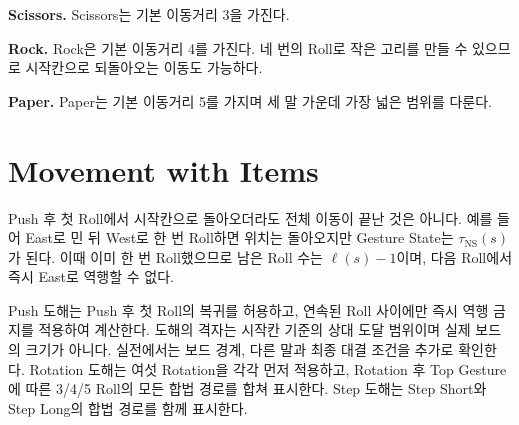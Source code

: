 \medskip
\noindent\textbf{Scissors.}
Scissors는 기본 이동거리 3을 가진다.


\medskip
\noindent\textbf{Rock.}
Rock은 기본 이동거리 4를 가진다. 네 번의 Roll로 작은 고리를 만들 수 있으므로 시작칸으로 되돌아오는 이동도 가능하다.


\medskip
\noindent\textbf{Paper.}
Paper는 기본 이동거리 5를 가지며 세 말 가운데 가장 넓은 범위를 다룬다.


\section{Movement with Items}

Push 후 첫 Roll에서 시작칸으로 돌아오더라도 전체 이동이 끝난 것은 아니다. 예를 들어 East로 민 뒤 West로 한 번 Roll하면 위치는 돌아오지만 Gesture State는 $\tau_{\mathrm{NS}}(s)$가 된다. 이때 이미 한 번 Roll했으므로 남은 Roll 수는 $\ell(s)-1$이며, 다음 Roll에서 즉시 East로 역행할 수 없다.


Push 도해는 Push 후 첫 Roll의 복귀를 허용하고, 연속된 Roll 사이에만 즉시 역행 금지를 적용하여 계산한다. 도해의 격자는 시작칸 기준의 상대 도달 범위이며 실제 보드의 크기가 아니다. 실전에서는 보드 경계, 다른 말과 최종 대결 조건을 추가로 확인한다. Rotation 도해는 여섯 Rotation을 각각 먼저 적용하고, Rotation 후 Top Gesture에 따른 3/4/5 Roll의 모든 합법 경로를 합쳐 표시한다. Step 도해는 Step Short와 Step Long의 합법 경로를 함께 표시한다.














